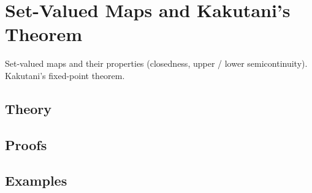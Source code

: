 
\section{Set-Valued Maps and Kakutani's Theorem}
\label{sec:2.4.11-set-valued-maps}

\begin{ticket}
Set-valued maps and their properties (closedness, upper / lower semicontinuity). Kakutani's fixed-point theorem.
\end{ticket}

\subsection*{Theory}

\subsection*{Proofs}

\subsection*{Examples}

